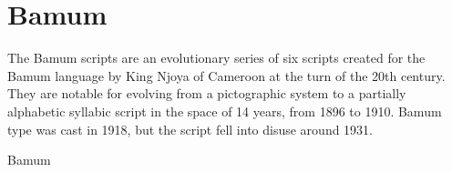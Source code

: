 \section{Bamum}
\label{s:bamum}
The Bamum scripts are an evolutionary series of six scripts created for the Bamum language by King Njoya of Cameroon at the turn of the 20th century. They are notable for evolving from a pictographic system to a partially alphabetic syllabic script in the space of 14 years, from 1896 to 1910. Bamum type was cast in 1918, but the script fell into disuse around 1931.

\newfontfamily{}

\begin{scriptexample}[]{Bamum}
\end{scriptexample}